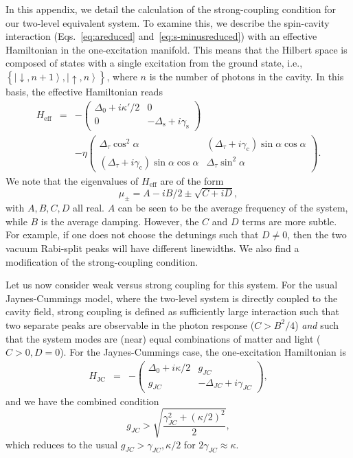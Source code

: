 \documentclass[twocolumn,english,aps,prl,preprint,reprint,showpacs,longbibliography,showkeys]{revtex4-1}
\begin{document}
 In this appendix, we detail the calculation of the strong-coupling condition for our two-level equivalent system. To examine this, we describe the spin-cavity interaction (Eqs.~\eqref{eq:areduced} and~\eqref{eq:s-minusreduced}) with an effective Hamiltonian in the one-excitation manifold. This means  that the Hilbert space is composed of states with a single excitation from the ground state, i.e., $\left\{\left|\downarrow,n+1\right\rangle, \left|\uparrow,n\right\rangle\right\}$, where $n$ is the number of photons in the cavity. In this basis, the effective Hamiltonian reads
 \begin{eqnarray}H_{\mathrm{eff}}&=&-
\begin{pmatrix}
\Delta_0+i\kappa'/2 &  0 \\
0 & -\Delta_{\mathrm{s}}+i\gamma_{\mathrm{s}}
\end{pmatrix}\\
&&-\eta\begin{pmatrix}
\Delta_{\tau}\cos^2\alpha &  (\Delta_{\tau}+i\gamma_{\mathrm{c}})\sin\alpha\cos\alpha \\
(\Delta_{\tau}+i\gamma_{\mathrm{c}})\sin\alpha\cos\alpha & \Delta_{\tau}\sin^2\alpha 
\end{pmatrix}
.\nonumber
\end{eqnarray} 
We note that the eigenvalues of $H_{\mathrm{eff}}$ are of the form
\begin{equation}
\mu_{\pm} = A - i B/2 \pm \sqrt{C + i D} ,
\end{equation}
with $A, B, C, D$ all real. $A$ can be seen to be the average frequency of the system, while $B$ is the average damping. However, the $C$ and $D$ terms are more subtle. For example, if one does not choose the  detunings such that $D \neq 0$, then the two vacuum Rabi-split peaks will have different linewidths. We also find a modification of the strong-coupling condition.

Let us now consider weak versus strong coupling for this system. For the usual Jaynes-Cummings model, where the two-level system is directly coupled to the cavity field, strong coupling is defined as sufficiently large interaction such that two separate peaks are observable in the photon response ($C > B^2/4$) \emph{and} such that the system modes are (near) equal combinations of matter and light ($C > 0, D = 0$).  For the Jaynes-Cummings case, the one-excitation Hamiltonian is 
 \begin{eqnarray}H_{\mathrm{JC}}&=&-
\begin{pmatrix}
\Delta_0+i\kappa/2 &  g_{JC} \\
g_{JC} & -\Delta_{JC}+i\gamma_{JC}
\end{pmatrix} ,
\end{eqnarray} 
and we have the combined condition 
\begin{equation}
g_{JC} > \sqrt{\frac{\gamma_{JC}^2 + (\kappa/2)^2}{2}} ,
\end{equation}
which reduces to the usual $g_{JC} > \gamma_{JC}, \kappa/2$ for $2\gamma_{JC} \approx \kappa$.
\end{document}
